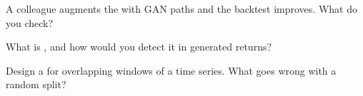 \begin{interviewq}\label{iq:ml:generative-models-and-synthetic-data:4}
A colleague augments the  with GAN paths and the backtest improves. What do you check?
\end{interviewq}

\begin{interviewq}\label{iq:ml:generative-models-and-synthetic-data:5}
What is , and how would you detect it in generated returns?
\end{interviewq}

\begin{interviewq}\label{iq:ml:generative-models-and-synthetic-data:6}
Design a  for overlapping windows of a time series. What goes wrong with a random split?
\end{interviewq}
